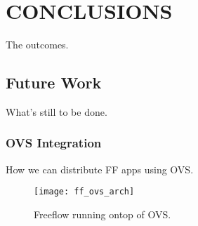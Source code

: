 \chapter{CONCLUSIONS}
\label{concl}
The outcomes.

\section{Future Work}
\label{concl:future}
What's still to be done.

\subsection{OVS Integration}
\label{future:ovs}
How we can distribute FF apps using OVS.

\begin{figure}
\centering
\texttt{[image: ff\_ovs\_arch]}
\caption{Freeflow running ontop of OVS.}
\label{ff_ovs_arch}
\end{figure}